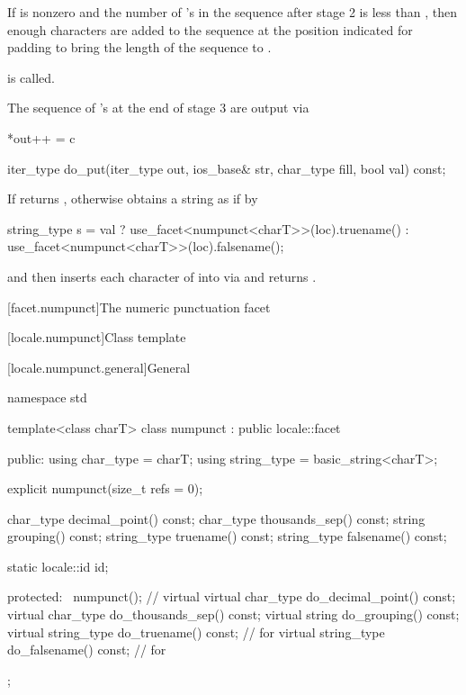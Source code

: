 \begin{itemdescr}
\begin{description}
If  is nonzero and the number of 's
in the sequence after stage 2 is less than ,
then enough  characters are added to the sequence
at the position indicated for padding
to bring the length of the sequence to .

 is called.

The sequence of 's at the end of stage 3 are output via
\begin{codeblock}
*out++ = c
\end{codeblock}
\end{description}
\end{itemdescr}

%
\begin{itemdecl}
iter_type do_put(iter_type out, ios_base& str, char_type fill, bool val) const;
\end{itemdecl}

\begin{itemdescr}
\pnum
\returns
If 
returns ,
otherwise obtains a string  as if by
\begin{codeblock}
string_type s =
  val ? use_facet<numpunct<charT>>(loc).truename()
      : use_facet<numpunct<charT>>(loc).falsename();
\end{codeblock}
and then inserts each character  of  into 
via 
and returns .
\end{itemdescr}

[facet.numpunct]{The numeric punctuation facet}

[locale.numpunct]{Class template }

[locale.numpunct.general]{General}

%
\begin{codeblock}
namespace std {
  template<class charT>
    class numpunct : public locale::facet {
    public:
      using char_type   = charT;
      using string_type = basic_string<charT>;

      explicit numpunct(size_t refs = 0);

      char_type    decimal_point()   const;
      char_type    thousands_sep()   const;
      string       grouping()        const;
      string_type  truename()        const;
      string_type  falsename()       const;

      static locale::id id;

    protected:
      ~numpunct();                                              // virtual
      virtual char_type    do_decimal_point() const;
      virtual char_type    do_thousands_sep() const;
      virtual string       do_grouping()      const;
      virtual string_type  do_truename()      const;            // for 
      virtual string_type  do_falsename()     const;            // for 
    };
}
\end{codeblock}

